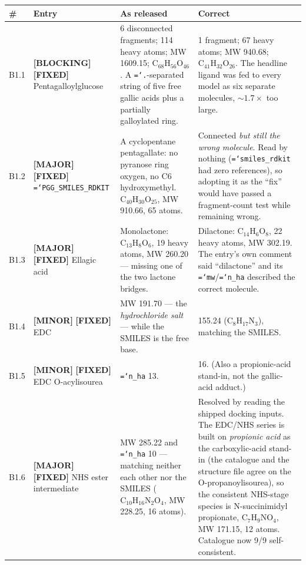 \documentclass[11pt,a4paper]{article}
\newcommand{\ok}[1]{\textcolor{okgreen}{#1}}
\newcommand{\bad}[1]{\textcolor{badred}{#1}}
\newcommand{\warn}[1]{\textcolor{warnamber}{#1}}
\newcommand{\code}[1]{\texttt{\small\hyphenchar\font=`\-\relax #1}}
\newcommand{\SBLOCK}{\bad{\textbf{[BLOCKING]}}}
\newcommand{\SMAJOR}{\warn{\textbf{[MAJOR]}}}
\newcommand{\SMINOR}{\textbf{[MINOR]}}
\newcommand{\SFIXED}{\ok{\textbf{[FIXED]}}}
\begin{document}
\begin{longtable}{@{}L{0.6cm}L{4.0cm}L{4.6cm}L{5.1cm}@{}}
\toprule
\textbf{\#} & \textbf{Entry} & \textbf{As released} & \textbf{Correct} \\
\midrule
\endhead
B1.1 & \SBLOCK{} \SFIXED{} Pentagalloylglucose &
  \bad{6 disconnected fragments}; 114 heavy atoms; MW 1609.15;
  $\mathrm{C_{68}H_{56}O_{46}}$. A \code{.}-separated string of five free
  gallic acids plus a partially galloylated ring. &
  \ok{1 fragment}; 67 heavy atoms; MW 940.68;
  $\mathrm{C_{41}H_{32}O_{26}}$. The headline ligand was fed to every model
  as six separate molecules, ${\sim}1.7\times$ too large. \\
B1.2 & \SMAJOR{} \SFIXED{} \code{PGG\_SMILES\_RDKIT} &
  A cyclopentane pentagallate: no pyranose ring oxygen, no C6
  hydroxymethyl. $\mathrm{C_{40}H_{30}O_{25}}$, MW 910.66, 65 atoms. &
  Connected \emph{but still the wrong molecule}. Read by nothing
  (\code{smiles\_rdkit} had zero references), so adopting it as the ``fix''
  would have passed a fragment-count test while remaining wrong. \\
B1.3 & \SMAJOR{} \SFIXED{} Ellagic acid &
  \bad{Monolactone}: $\mathrm{C_{13}H_{8}O_{6}}$, 19 heavy atoms, MW 260.20
  --- missing one of the two lactone bridges. &
  \ok{Dilactone}: $\mathrm{C_{14}H_{6}O_{8}}$, 22 heavy atoms, MW 302.19.
  The entry's own comment said ``dilactone'' and its \code{mw}/\code{n\_ha}
  described the correct molecule. \\
B1.4 & \SMINOR{} \SFIXED{} EDC &
  MW 191.70 --- the \emph{hydrochloride salt} --- while the SMILES is the
  free base. & 155.24 ($\mathrm{C_8H_{17}N_3}$), matching the SMILES. \\
B1.5 & \SMINOR{} \SFIXED{} EDC O-acylisourea &
  \code{n\_ha} 13. & 16. (Also a propionic-acid stand-in, not the gallic-acid
  adduct.) \\
B1.6 & \SMAJOR{} \SFIXED{} NHS ester intermediate &
  MW 285.22 and \code{n\_ha} 10 --- matching neither each other nor the
  SMILES ($\mathrm{C_{10}H_{16}N_2O_4}$, MW 228.25, 16 atoms). &
  Resolved by reading the shipped docking inputs. The EDC/NHS series is built
  on \emph{propionic acid} as the carboxylic-acid stand-in (the catalogue and
  the structure file agree on the O-propanoylisourea), so the consistent
  NHS-stage species is \ok{N-succinimidyl propionate},
  $\mathrm{C_7H_9NO_4}$, MW 171.15, 12 atoms. Catalogue now
  \ok{9/9 self-consistent}. \\
\bottomrule
\end{longtable}
\end{document}
